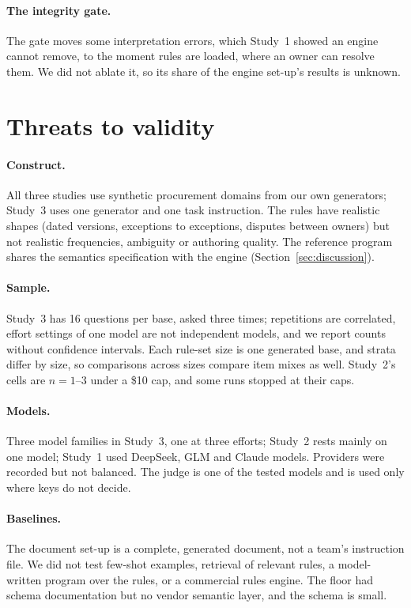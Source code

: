 \documentclass[11pt]{article}
\begin{document}
\paragraph{The integrity gate.} The gate moves some interpretation errors, which Study~1 showed an engine cannot
remove, to the moment rules are loaded, where an owner can resolve them. We did not ablate it, so its share of the
engine set-up's results is unknown.

\section{Threats to validity}
\label{sec:threats}

\paragraph{Construct.} All three studies use synthetic procurement domains from our own generators; Study~3 uses
one generator and one task instruction. The rules have realistic shapes (dated versions, exceptions to exceptions,
disputes between owners) but not realistic frequencies, ambiguity or authoring quality. The reference program
shares the semantics specification with the engine (Section~\ref{sec:discussion}).

\paragraph{Sample.} Study~3 has 16 questions per base, asked three times; repetitions are correlated, effort
settings of one model are not independent models, and we report counts without confidence intervals. Each
rule-set size is one generated base, and strata differ by size, so comparisons across sizes compare item mixes as
well. Study~2's cells are $n=1$--3 under a \$10 cap, and some runs stopped at their caps.

\paragraph{Models.} Three model families in Study~3, one at three efforts; Study~2 rests mainly on one model;
Study~1 used DeepSeek, GLM and Claude models. Providers were recorded but not balanced. The judge is one of the
tested models and is used only where keys do not decide.

\paragraph{Baselines.} The document set-up is a complete, generated document, not a team's instruction file. We did
not test few-shot examples, retrieval of relevant rules, a model-written program over the rules, or a commercial
rules engine. The floor had schema documentation but no vendor semantic layer, and the schema is small.
\end{document}
